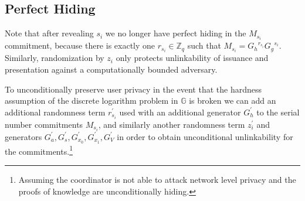 \documentclass{article}
\begin{document}
\subsection{Perfect Hiding}

Note that after revealing $s_i$ we no longer have perfect hiding in the $M_{s_i}$ commitment, because there is exactly one $r_{s_i} \in \mathbb{Z}_q$ such that $M_{s_i} = {G_h}^{r_{s_i}} {G_g}^{s_i}$. Similarly, randomization by $z_i$ only protects unlinkability of issuance and presentation against a computationally bounded adversary.

To unconditionally preserve user privacy in the event that the hardness assumption of the discrete logarithm problem in $\mathbb{G}$ is broken we can add an additional randomness term $r_{s_i}^{\prime}$ used with an additional generator $G_h^{\prime}$ to the serial number commitments $M_{s_i}$, and similarly another randomness term $z_i^{\prime}$ and generators $G_a^{\prime}, G_s^{\prime}, G_{x_0}^{\prime}, G_{x_1}^{\prime}, G_V^{\prime}$ in order to obtain unconditional unlinkability for the commitments.\footnote{Assuming the coordinator is not able to attack network level privacy and the proofs of knowledge are unconditionally hiding.}


\printbibliography
\end{document}
